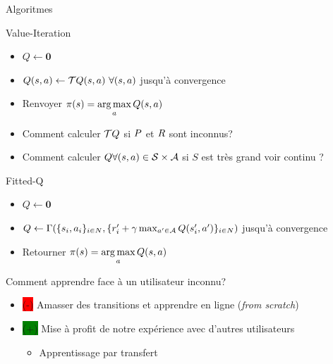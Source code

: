 \documentclass[french,handout]{beamer}
\newcommand{\cplus}{\colorbox{green}{(+)} }
\newcommand{\cmoins}{\colorbox{red}{(-)} }
\begin{document}
    \begin{frame}{Algoritmes}

        \begin{block}{Value-Iteration}
            \begin{itemize}
                \item $Q \leftarrow \mathbf{0}$
                \item $Q(s,a) \leftarrow \mathcal{T} Q(s,a)\ \forall (s,a)$ jusqu'à convergence
                \item Renvoyer $\pi(s) = \operatorname*{arg\,max}\limits_{a} Q(s,a)$
            \end{itemize}
        \end{block}

        \begin{alertblock}{}
            \begin{itemize}
                \item Comment calculer $\mathcal{T} Q$ si $P$ et $R$ sont inconnus?
                \item Comment calculer $Q \forall (s,a) \in \mathcal{S}\times\mathcal{A}$ si $S$ est très grand voir continu ?
            \end{itemize}

        \end{alertblock}

        \begin{block}{Fitted-Q}
            \begin{itemize}
                \item $Q \leftarrow \mathbf{0}$
                \item $Q \leftarrow \Gamma(\{s_{i},a_{i}\}_{{i}\in N},\{r'_{i} + \gamma  \max_{a'\in\mathcal{A}} Q(s'_i,a')\}_{{i} \in N})$ jusqu'à convergence
                \item Retourner $\pi(s) = \operatorname*{arg\,max}\limits_{a} Q(s,a)$
            \end{itemize}
        \end{block}


    \end{frame}

    \begin{frame}{}


        \begin{alertblock}{}
            Comment apprendre face à un utilisateur inconnu?
        \end{alertblock}


        \begin{itemize}
            \item \cmoins Amasser des transitions et apprendre en ligne (\textit{from scratch})
            \item \cplus Mise à profit de notre expérience avec d'autres utilisateurs
            \begin{itemize}
                \item Apprentissage par transfert
            \end{itemize}

        \end{itemize}


    \end{frame}
\end{document}
